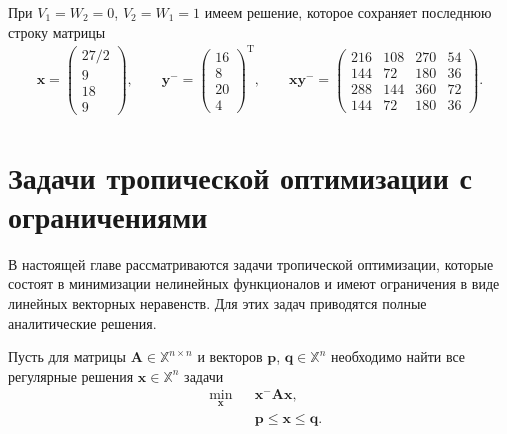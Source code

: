 \documentclass[specialist,
               substylefile = spbu.rtx,
               subf,href,colorlinks=true, 12pt]{disser}
\DeclareMathOperator{\T}{T}
\theoremstyle{definition}
\begin{document}
При $V_{1}=W_{2}=0$, $V_{2}=W_{1}=1$ имеем решение, которое сохраняет последнюю строку матрицы
\begin{gather*}
\bm{x}
=
\left(
\begin{array}{c}
27/2
\\
9
\\
18
\\
9
\end{array}
\right),
\qquad
\bm{y}^{-}
=
\left(
\begin{array}{c}
16
\\
8
\\
20
\\
4
\end{array}
\right)^{\T},
\qquad
\bm{x}\bm{y}^{-}
=
\left(
\begin{array}{cccc}
216 & 108 & 270 & 54
\\
144 & 72 & 180 & 36
\\
288 & 144 & 360 & 72
\\
144 & 72 & 180 & 36
\end{array}
\right).
\end{gather*}

\chapter{Задачи тропической оптимизации с ограничениями}\label{chap:PTOC}
В настоящей главе рассматриваются задачи тропической оптимизации, которые состоят в минимизации нелинейных функционалов и имеют ограничения в виде линейных векторных неравенств. Для этих задач приводятся полные аналитические решения. %

Пусть для матрицы $\bm{A}\in\mathbb{X}^{n\times n}$ и векторов $\bm{p}$, $\bm{q}\in\mathbb{X}^{n}$ необходимо найти все регулярные решения $\bm{x}\in\mathbb{X}^{n}$ задачи 
\begin{equation}\label{eq:x-Axsub_gxh}
\begin{aligned}
&
\min_{\bm{x}}
&&\bm{x}^{-}\bm{A}\bm{x},\\
& &&\bm{p}\leq\bm{x}\leq\bm{q}.
\end{aligned}
\end{equation}
\end{document}
